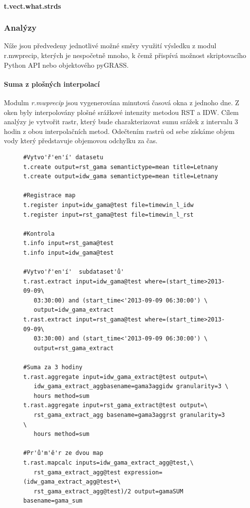 \documentclass[a4paper,12pt,oneside]{report}
\begin{document}
\paragraph*{t.vect.what.strds}






\subsubsection*{Analýzy}
Níže jsou předvedeny jednotlivé možné směry využití výsledku z modul r.mwprecip, kterých je nespočetně mnoho, k čemž přispívá možnost skriptovacího Python API nebo objektového pyGRASS. 

\paragraph*{Suma z plošných interpolací}
Modulm \emph{r.mwprecip} jsou vygenerována minutová časová okna z jednoho dne. Z oken byly interpolovány plošné srážkové intenzity metodou RST a IDW. Cílem analýzy je vytvořit rastr, který bude charakterizovat sumu srážek z intervalu 3 hodin z obou interpolačních metod. Odečtením rastrů od sebe získáme objem vody který představuje objemovou odchylku za čas.


\begin{figure}[h!]
\begin{footnotesize}
\lstset{extendedchars=false,
escapeinside=''}
\begin{lstlisting}[style=mybash]
#Vytvo'ř'en'í' datasetu
t.create output=rst_gama semantictype=mean title=Letnany
t.create output=idw_gama semantictype=mean title=Letnany

#Registrace map 
t.register input=idw_gama@test file=timewin_l_idw
t.register input=rst_gama@test file=timewin_l_rst

#Kontrola
t.info input=rst_gama@test                                                      
t.info input=idw_gama@test

#Vytvo'ř'en'í'  subdataset'ů'
t.rast.extract input=idw_gama@test where=(start_time>2013-09-09\
   03:30:00) and (start_time<'2013-09-09 06:30:00') \
   output=idw_gama_extract
t.rast.extract input=rst_gama@test where=(start_time>2013-09-09\
   03:30:00) and (start_time<'2013-09-09 06:30:00') \
   output=rst_gama_extract

#Suma za 3 hodiny
t.rast.aggregate input=idw_gama_extract@test output=\
   idw_gama_extract_aggbasename=gama3aggidw granularity=3 \
   hours method=sum
t.rast.aggregate input=rst_gama_extract@test output=\
   rst_gama_extract_agg basename=gama3aggrst granularity=3 \
   hours method=sum

#Pr'ů'm'ě'r ze dvou map
t.rast.mapcalc inputs=idw_gama_extract_agg@test,\
   rst_gama_extract_agg@test expression=(idw_gama_extract_agg@test+\
   rst_gama_extract_agg@test)/2 output=gamaSUM basename=gama_sum
\end{lstlisting}
\end{footnotesize} 
\end{figure}
\end{document}
